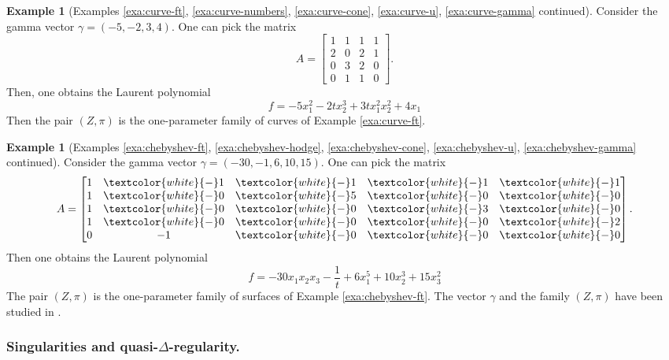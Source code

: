 \documentclass[11pt, reqno]{amsart}
\theoremstyle{plain}
\theoremstyle{definition}
\newtheorem{example}[thm]{Example}
\begin{document}
\begin{example}[Examples \ref{exa:curve-ft}, \ref{exa:curve-numbers}, \ref{exa:curve-cone}, \ref{exa:curve-u}, \ref{exa:curve-gamma} continued]
\label{eq:curve-pair}
Consider the gamma vector $\gamma= (-5,-2,3,4)$. One can pick the matrix 
\begin{equation*}
   A= \begin{bmatrix}
        1 & 1 & 1 & 1 \\
        2 & 0 & 2 & 1 \\
        0 & 3 & 2 & 0 \\
        0 & 1 &  1 & 0
    \end{bmatrix}.
\end{equation*}
Then, one obtains the Laurent polynomial
    \[
    f=-5x_1^2 -2t  x_2^3+ 3tx_1^2x_2^2+4x_1
    \] 
Then the pair $(Z, \pi)$ is the one-parameter family of curves of Example \ref{exa:curve-ft}. 
\end{example}
\begin{example}[Examples \ref{exa:chebyshev-ft}, \ref{exa:chebyshev-hodge}, \ref{exa:chebyshev-cone}, \ref{exa:chebyshev-u}, \ref{exa:chebyshev-gamma} continued] 
Consider the gamma vector $\gamma= (-30,-1,6,10,15)$.  One can pick the matrix 
\begin{equation*}
   A= \begin{bmatrix}
        1 & \textcolor{white}{-}1 & \textcolor{white}{-}1 & \textcolor{white}{-}1 & \textcolor{white}{-}1\\
        1 & \textcolor{white}{-}0 & \textcolor{white}{-} 5 & \textcolor{white}{-}0 & \textcolor{white}{-} 0\\
        1 & \textcolor{white}{-}0 & \textcolor{white}{-} 0 & \textcolor{white}{-} 3 & \textcolor{white}{-} 0\\
        1 & \textcolor{white}{-}0 & \textcolor{white}{-}0 & \textcolor{white}{-}0 & \textcolor{white}{-}2\\
        0 & -1 &  \textcolor{white}{-}0 & \textcolor{white}{-}0 &\textcolor{white}{-}0
    \end{bmatrix}.
\end{equation*}
Then one obtains the Laurent polynomial
\[
f=-30 x_1x_2x_3 -\frac{1}{t}+6x_1^5+10 x_2^3 +15 x_3^2
\]
The pair $(Z, \pi)$ is the one-parameter family of surfaces of Example \ref{exa:chebyshev-ft}. The vector $\gamma$ and the family $(Z, \pi)$ have been studied in \cite{FRV-duke}.
\end{example}
\smallskip

\subsubsection{Singularities and quasi-$\Delta$-regularity.} 
\label{sec:sing-quasiD}
\end{document}
